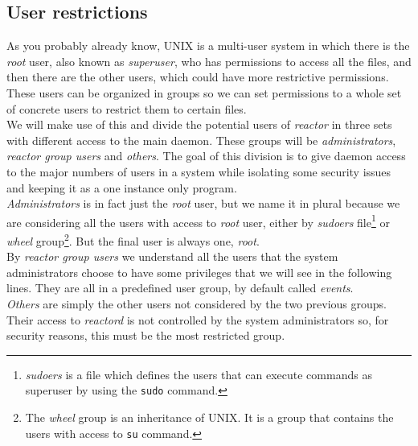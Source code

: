 \subsection{User restrictions}
\label{sec:users}
As you probably already know, UNIX is a multi-user system in which there is the \emph{root} user, also known as \emph{superuser}, who has 
permissions to access all the files, and then there are the other users, which could have more restrictive permissions. These users can
be organized in groups so we can set permissions to a whole set of concrete users to restrict them to certain files.\\
We will make use of this and divide the potential users of \emph{reactor} in three sets with different access to the main daemon. These
groups will be \emph{administrators}, \emph{reactor group users} and \emph{others}. The goal of this division is to give daemon access 
to the major numbers of users in a system while isolating some security issues and keeping it as a one instance only program.\\
\emph{Administrators} is in fact just the \emph{root} user, but we name it in plural because we are considering all the users with access 
to \emph{root} user, either by \emph{sudoers} file\footnote{\emph{sudoers} is a file which defines the users that can execute commands as 
superuser by using the \texttt{sudo} command.} or \emph{wheel} group\footnote{The \emph{wheel} group is an inheritance of UNIX. It is a 
group that contains the users with access to \texttt{su} command.}. But the final user is always one, \emph{root}.\\
By \emph{reactor group users} we understand all the users that the system administrators choose to have some privileges that we will see 
in the following lines. They are all in a predefined user group, by default called \emph{events}.\\
\emph{Others} are simply the other users not considered by the two previous groups. Their access to \emph{reactord} is not controlled by 
the system administrators so, for security reasons, this must be the most restricted group.\\
